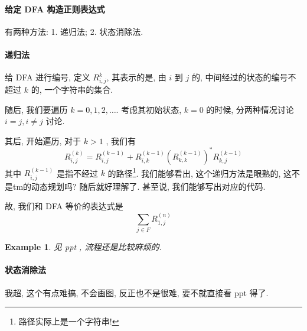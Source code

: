 \documentclass[12pt]{ctexart}
\theoremstyle{definition}
\theoremstyle{definition}
\theoremstyle{plain}
\newtheorem{exam}[definition]{Example}
\begin{document}
\paragraph{给定 DFA 构造正则表达式}  有两种方法: 1. 递归法; 2. 状态消除法. 
\paragraph{递归法}
给 DFA 进行编号, 定义 \(R _{i , j} ^{k}\), 其表示的是, 由 \(i\) 到 \(j\) 的, 中间经过的状态的编号不超过 \(k\) 的, 一个字符串的集合. 

随后, 我们要遍历 \(k = 0 , 1 , 2 , \dots \). 考虑其初始状态, \(k = 0\) 的时候, 分两种情况讨论 \(i = j , i \ne j \) 讨论. 

其后, 开始遍历, 对于 \(k > 1 \) , 我们有
\begin{equation}
R _{i , j } ^{ (k ) } =  R_{i, j} ^{ (k - 1)} + R _{i , k} ^{(k - 1) } ( R _{k , k} ^{ (k -1  )} ) ^{*} R _{k , j} ^{ (k - 1) }
\end{equation}
其中 \(R _{i, j} ^{ (k -1) }\) 是指不经过 \(k\) 的路径\footnote{路径实际上是一个字符串!}. 我们能够看出, 这个递归方法是眼熟的, 这不是tm的动态规划吗? 随后就好理解了.  甚至说, 我们能够写出对应的代码. 

故, 我们和 DFA 等价的表达式是
\begin{equation}
\sum _{j \in F} R _{1, j} ^{(n)}
\end{equation}
\begin{exam}
见 ppt , 流程还是比较麻烦的.
\end{exam}

\paragraph{状态消除法} 
我超, 这个有点难搞, 不会画图, 反正也不是很难, 要不就直接看 ppt 得了. 
\end{document}
